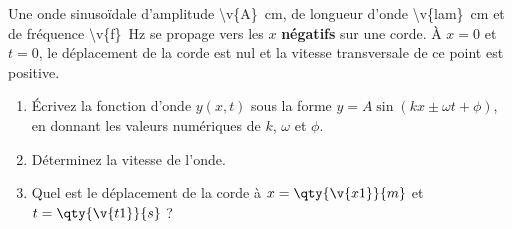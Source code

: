 Une onde sinusoïdale d'amplitude \qty{\v{A}}{cm}, de longueur d'onde \qty{\v{lam}}{cm} et de fréquence \qty{\v{f}}{Hz} se propage vers les $x$ \textbf{négatifs} sur une corde. À $x = 0$ et $t = 0$, le déplacement de la corde est nul et la vitesse transversale de ce point est positive.

\begin{enumerate}[label=\alph*)]
    \item Écrivez la fonction d'onde $y(x,t)$ sous la forme $y = A\sin(kx \pm \omega t + \phi)$, en donnant les valeurs numériques de $k$, $\omega$ et $\phi$.
    \item Déterminez la vitesse de l'onde.
    \item Quel est le déplacement de la corde à $x = \qty{\v{x1}}{m}$ et $t = \qty{\v{t1}}{s}$ ?
\end{enumerate}
